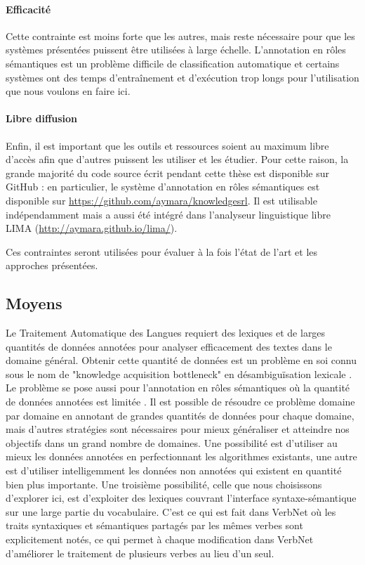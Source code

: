\paragraph{Efficacité} Cette contrainte est moins forte que les autres, mais
reste nécessaire pour que les systèmes présentées puissent être utilisées à
large échelle. L'annotation en rôles sémantiques est un problème difficile de
classification automatique et certains systèmes ont des temps d'entraînement et
d'exécution trop longs pour l'utilisation que nous voulons en faire ici.

\paragraph{Libre diffusion} Enfin, il est important que les outils et
ressources soient au maximum libre d'accès afin que d'autres puissent les
utiliser et les étudier. Pour cette raison, la grande majorité du code source
écrit pendant cette thèse est disponible sur GitHub : en particulier, le
système d'annotation en rôles sémantiques est disponible sur
\url{https://github.com/aymara/knowledgesrl}. Il est utilisable indépendamment
mais a aussi été intégré dans l'analyseur linguistique libre LIMA
(\url{http://aymara.github.io/lima/}).

Ces contraintes seront utilisées pour évaluer à la fois l'état de l'art et les
approches présentées.

\subsection{Moyens}
\label{objectifs_these}


Le Traitement Automatique des Langues requiert des lexiques et de larges
quantités de données annotées pour analyser efficacement des textes dans le
domaine général. Obtenir cette quantité de données est un problème en soi connu
sous le nom de "knowledge acquisition bottleneck" en désambiguïsation lexicale
\citep{gale1992method,navigli2009word}. Le problème se pose aussi pour
l'annotation en rôles sémantiques où la quantité de données annotées est
limitée \citep[section 1]{das2012structure}. Il est possible de résoudre ce
problème domaine par domaine en annotant de grandes quantités de données pour
chaque domaine, mais d'autres stratégies sont nécessaires pour mieux
généraliser et atteindre nos objectifs dans un grand nombre de domaines. Une
possibilité est d'utiliser au mieux les données annotées en perfectionnant les
algorithmes existants, une autre est d'utiliser intelligemment les données non
annotées qui existent en quantité bien plus importante. Une troisième
possibilité, celle que nous choisissons d'explorer ici, est d'exploiter des
lexiques couvrant l'interface syntaxe-sémantique sur une large partie du
vocabulaire. C'est ce qui est fait dans VerbNet où les traits syntaxiques et
sémantiques partagés par les mêmes verbes sont explicitement notés, ce qui
permet à chaque modification dans VerbNet d'améliorer le traitement de
plusieurs verbes au lieu d'un seul.

